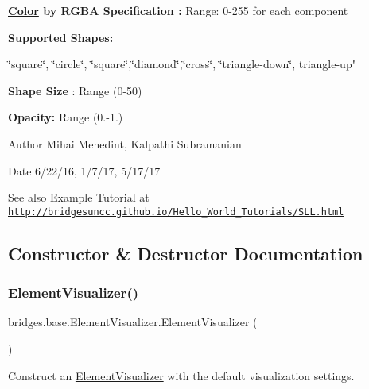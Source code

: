 {\bfseries  \hyperlink{classbridges_1_1base_1_1_color}{Color} by R\+G\+BA Specification \+:} Range\+: 0-\/255 for each component 

{\bfseries Supported Shapes\+: }

\char`\"{}square\char`\"{}, \char`\"{}circle\char`\"{}, \char`\"{}square\char`\"{},\char`\"{}diamond\char`\"{},\char`\"{}cross\char`\"{}, \char`\"{}triangle-\/down\char`\"{}, triangle-\/up" 

{\bfseries  Shape Size} \+: Range (0-\/50) 

{\bfseries  Opacity\+: } Range (0.-\/1.) 

\begin{DoxyAuthor}{Author}
Mihai Mehedint, Kalpathi Subramanian
\end{DoxyAuthor}
\begin{DoxyDate}{Date}
6/22/16, 1/7/17, 5/17/17
\end{DoxyDate}
\begin{DoxySeeAlso}{See also}
Example Tutorial at ~\newline
 \href{http://bridgesuncc.github.io/Hello_World_Tutorials/SLL.html}{\tt http\+://bridgesuncc.\+github.\+io/\+Hello\+\_\+\+World\+\_\+\+Tutorials/\+S\+L\+L.\+html} 
\end{DoxySeeAlso}


\subsection{Constructor \& Destructor Documentation}
\hypertarget{classbridges_1_1base_1_1_element_visualizer_acbca874876ec1e8dbbde6484a4fc056e}{}\label{classbridges_1_1base_1_1_element_visualizer_acbca874876ec1e8dbbde6484a4fc056e} 
\subsubsection{\texorpdfstring{Element\+Visualizer()}{ElementVisualizer()}\hspace{0.1cm}{\footnotesize\ttfamily [1/6]}}
{\footnotesize\ttfamily bridges.\+base.\+Element\+Visualizer.\+Element\+Visualizer (\begin{DoxyParamCaption}{ }\end{DoxyParamCaption})}

Construct an \hyperlink{classbridges_1_1base_1_1_element_visualizer}{Element\+Visualizer} with the default visualization settings.

